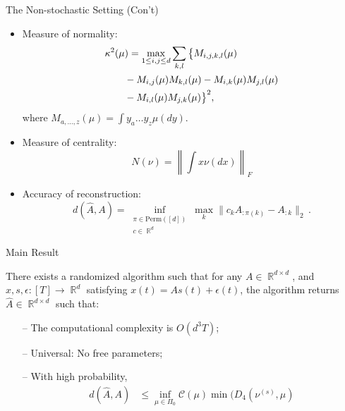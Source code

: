 \documentclass[final]{beamer} %
\newcommand{\eps}{\epsilon}
\DeclareMathOperator{\real}{\mathbb{R}}
\begin{document}
\begin{frame}[c]
\begin{columns}[t,totalwidth=\textwidth]
	\begin{column}{.32\textwidth}%
		\begin{block}{The Non-stochastic Setting (Con't)}
			\begin{itemize}
				\item Measure of normality:
					\begin{align*}
							\MoveEqLeft \kappa^2(\mu)  =   \max_{1\le i,j\le d} \sum_{k,l} 
							\big\{ 
							M_{i,j,k,l}(\mu) \\
							& - M_{i,j}(\mu) M_{k,l}(\mu) -  M_{i,k}(\mu) M_{j,l}(\mu) \\
							& - M_{i,l}(\mu) M_{j,k}(\mu)\big\}^2,
					\end{align*}
					where $M_{a,\dots,z}(\mu) = \int y_a \dots y_z \mu(dy)$.
				\item Measure of centrality: 
					\[
				 	N(\nu) = \left\|\int x \nu(dx) \right\|_F
					\]
				\item Accuracy of reconstruction:
					\[
					d(\hat{A},A) = \inf_{
						 \substack{\pi \in \mathrm{Perm}([d])\\
						 c\in \real^d}} \max_{k} 
						\| c_k A_{:\pi(k)} - A_{:k} \|_2\,.
					\]
			\end{itemize}
		\end{block}
		\vspace{0.5ex}
		\begin{block}{Main Result}
		\begin{center}
				\begin{tcolorbox}[title = \vspace{0.4cm}\textbf{\large Main Result} \vspace{0.4cm}, title filled, width = 0.95\textwidth, colback = uofagreen!10, colframe = red]
						\vspace{0.5cm}
						There exists a randomized algorithm such that 
						for any $A\in \real^{d\times d}$, and $x, s, \eps: [T] \rightarrow \real^d$ satisfying $x(t) = As(t)+\eps(t)$,
						the algorithm returns $\hat{A}\in \real^{d \times d}$ such that:
							\begin{itemize}
								\item[--] The computational complexity is $O(d^3 T)$;
								\item[--] Universal: No free parameters;
								\item[--] With high probability, 
									\begin{align*}
									d(\hat{A}, A) & \le 
									\inf_{\mu\in \Pi_0} \mathcal{C}(\mu) \min\Big(D_4(\nu^{(s)},\mu) \\

\end{align*}
\end{itemize}
\end{tcolorbox}
\end{center}
\end{block}
\end{column}
\end{columns}
\end{frame}
\end{document}
